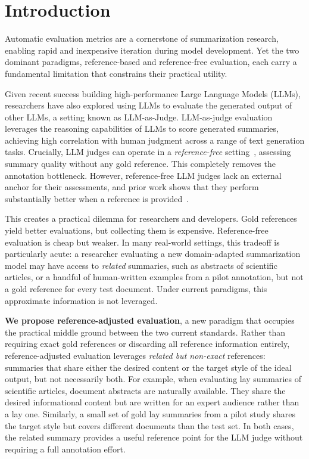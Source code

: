 

\section{Introduction}

Automatic evaluation metrics are a cornerstone of summarization research,
enabling rapid and inexpensive iteration during model development. Yet the two
dominant paradigms, reference-based and reference-free evaluation,
each carry a fundamental limitation that constrains their practical utility.

Given recent success building high-performance Large Language Models (LLMs), researchers have also explored using LLMs to evaluate the generated output of other LLMs, a setting known as LLM-as-Judge. LLM-as-judge evaluation~\cite{zheng2023judging,liu2023geval}
leverages the reasoning capabilities of LLMs to score generated summaries,
achieving high correlation with human judgment across a range of text
generation tasks. Crucially, LLM judges can operate in a
\textit{reference-free} setting~\cite{Deutsch2022LimitationsReferenceFree},
assessing summary quality without any gold reference. This completely removes the
annotation bottleneck. However, reference-free LLM judges
lack an external anchor for their assessments, and prior work shows that they
perform substantially better when a reference is
provided~\cite{zheng2023judging,kim2023prometheus}.

This creates a practical dilemma for researchers and developers. Gold
references yield better evaluations, but collecting them is expensive.
Reference-free evaluation is cheap but weaker. In many real-world settings,
this tradeoff is particularly acute: a researcher evaluating a new
domain-adapted summarization model may have access to \textit{related}
summaries, such as abstracts of scientific articles, or a handful of
human-written examples from a pilot annotation, but not a gold reference
for every test document. Under current paradigms, this approximate information is not leveraged. 




\textbf{We propose reference-adjusted evaluation}, a new paradigm that
occupies the practical middle ground between the two current standards. Rather than requiring exact gold references or discarding all reference information
entirely, reference-adjusted evaluation leverages \textit{related but
non-exact} references: summaries that share either the desired content or the
target style of the ideal output, but not necessarily both. For example, when
evaluating lay summaries of scientific articles, document abstracts are
naturally available. They share the desired informational content but are
written for an expert audience rather than a lay one. Similarly, a small set
of gold lay summaries from a pilot study shares the target style but covers
different documents than the test set. In both cases, the related summary
provides a useful reference point for the LLM judge without requiring a
full annotation effort. 

